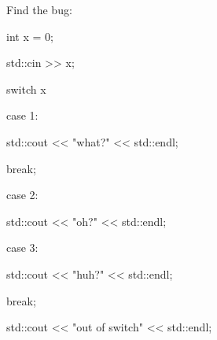 Find the bug:

\begin{console}

int x = 0;

std::cin >> x;

switch x

{

     case 1:

          std::cout << "what?" << std::endl;

          break;

          

     case 2:

          std::cout << "oh?" << std::endl;

          

     case 3:

          std::cout << "huh?" << std::endl;

          break;

}

std::cout << "out of switch" << std::endl;

\end{console}

